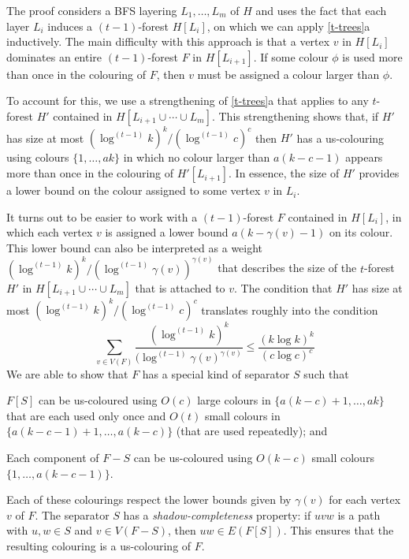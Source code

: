 \documentclass[kpfonts]{patmorin}
\theoremstyle{named}
\newcommand{\weirdref}[2]{\cref{#1}#2}
\begin{document}
The proof considers a BFS layering $L_1,\ldots,L_m$ of $H$ and uses the fact that each layer $L_i$ induces a $(t-1)$-forest $H[L_i]$, on which we can apply \weirdref{t-trees}{a} inductively.  The main difficulty with this approach is that a vertex $v$ in $H[L_i]$ dominates an entire $(t-1)$-forest $F$ in $H[L_{i+1}]$.  If some colour $\phi$ is used more than once in the colouring of $F$, then $v$ must be assigned a colour larger than $\phi$.

To account for this, we use a strengthening of \weirdref{t-trees}{a} that applies to any $t$-forest $H'$ contained in $H[L_{i+1}\cup\cdots\cup L_m]$.  This strengthening shows that, if $H'$ has size at most $(\log^{(t-1)} k)^k/(\log^{(t-1)} c)^c$ then $H'$ has a us-colouring using colours $\{1,\ldots,ak\}$ in which no colour larger than $a(k-c-1)$ appears more than once in the colouring of $H'[L_{i+1}]$.  In essence, the size of $H'$ provides a lower bound on the colour assigned to some vertex $v$ in $L_i$.

It turns out to be easier to work with a $(t-1)$-forest $F$ contained in $H[L_i]$, in which each vertex $v$ is assigned a lower bound $a(k-\gamma(v)-1)$ on its colour.  This lower bound can also be interpreted as a weight  $(\log^{(t-1)}k)^k/(\log^{(t-1)}\gamma(v))^{\gamma(v)}$ that describes the size of the $t$-forest $H'$ in $H[L_{i+1}\cup\cdots\cup L_m]$ that is attached to $v$.  The condition that $H'$ has size at most $(\log^{(t-1)} k)^k/(\log^{(t-1)} c)^c$ translates roughly into the condition
\[
   \sum_{v\in V(F)}\frac{(\log^{(t-1)}k)^k}{(\log^{(t-1)}\gamma(v)^{\gamma(v)}} \le \frac{(k\log k)^k}{(c\log c)^c}
\]
We are able to show that $F$ has a special kind of separator $S$ such that
\begin{compactenum}
    \item $F[S]$ can be us-coloured using $O(c)$ large colours in $\{a(k-c)+1,\ldots,ak\}$ that are each used only once and $O(t)$ small colours in $\{a(k-c-1)+1,\ldots,a(k-c)\}$ (that are used repeatedly); and
    \item Each component of $F-S$ can be us-coloured using $O(k-c)$ small colours $\{1,\ldots,a(k-c-1)\}$.
\end{compactenum}
Each of these colourings respect the lower bounds given by $\gamma(v)$ for each vertex $v$ of $F$.  The separator $S$ has a \emph{shadow-completeness} property: if $uvw$ is a path with $u,w\in S$ and $v\in V(F-S)$, then $uw\in E(F[S])$.  This ensures that the resulting colouring is a us-colouring of $F$.
\end{document}
